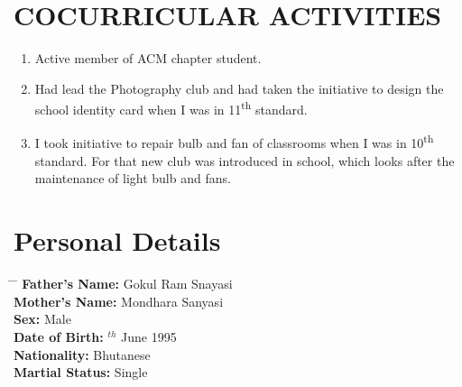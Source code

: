 \documentclass[10pt]{article}
\begin{document}
	\section{COCURRICULAR ACTIVITIES}
	\begin{enumerate}
		\item  {Active member of ACM chapter student.}
		\item  {Had lead the Photography club and had taken the initiative to design the school identity card when I was in 11\textsuperscript{th} standard.}
		\item  {I took initiative to repair bulb and fan of classrooms when I was in 10\textsuperscript{th} standard. For that new club was introduced in school, which looks after the maintenance of light bulb and fans.}
	\end{enumerate}

	\section{Personal Details}
	\begin{tabbing} 
		\hspace{4cm} \= \hspace{10cm} \= \kill
		{\bf Father's Name: } \> Gokul Ram Snayasi\\
		{\bf Mother's Name:  } \> Mondhara Sanyasi\\
		{\bf Sex: } \> Male\\
		{\bf Date of Birth: } $^{th}$ June 1995 \\
		{\bf Nationality:  }\> Bhutanese\\
		{\bf Martial Status: }\> Single\\
	\end{tabbing}
\end{document}
